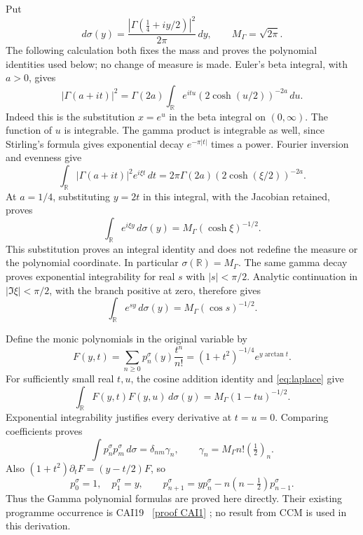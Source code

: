 \documentclass[11pt]{article}
\newcommand{\R}{\mathbb R}
\begin{document}
Put
\begin{equation}\label{eq:sigma}
 d\sigma(y)=\frac{|\Gamma(\tfrac14+iy/2)|^2}{2\pi}\,dy,
 \qquad M_\Gamma=\sqrt{2\pi}.
\end{equation}
The following calculation both fixes the mass and proves the polynomial
identities used below; no change of measure is made.
Euler's beta integral, with $a>0$, gives
\[
 |\Gamma(a+it)|^2
 =\Gamma(2a)\int_{\R}e^{itu}(2\cosh(u/2))^{-2a}\,du.
\]
Indeed this is the substitution $x=e^u$ in the beta integral on
$(0,\infty)$.  The function of $u$ is integrable.  The gamma product is
integrable as well, since Stirling's formula gives exponential decay
$e^{-\pi|t|}$ times a power.  Fourier inversion and evenness give
\[
 \int_{\R}|\Gamma(a+it)|^2e^{i\xi t}\,dt
 =2\pi\Gamma(2a)(2\cosh(\xi/2))^{-2a}.
\]
At $a=1/4$, substituting $y=2t$ in this integral, with the Jacobian
retained, proves
\begin{equation}\label{eq:transform}
 \int_{\R}e^{i\xi y}\,d\sigma(y)
 =M_\Gamma(\cosh\xi)^{-1/2}.
\end{equation}
This substitution proves an integral identity and does not redefine the
measure or the polynomial coordinate.  In particular
$\sigma(\R)=M_\Gamma$.  The same gamma decay proves exponential
integrability for real $s$ with $|s|<\pi/2$.  Analytic continuation in
$|\Im\xi|<\pi/2$, with the branch positive at zero, therefore gives
\begin{equation}\label{eq:laplace}
 \int_{\R}e^{sy}\,d\sigma(y)=M_\Gamma(\cos s)^{-1/2}.
\end{equation}

Define the monic polynomials in the original variable by
\begin{equation}\label{eq:gen}
 F(y,t)=\sum_{n\ge0}p_n^\sigma(y)\frac{t^n}{n!}
 =(1+t^2)^{-1/4}e^{y\arctan t}.
\end{equation}
For sufficiently small real $t,u$, the cosine addition identity and
\eqref{eq:laplace} give
\[
 \int_{\R}F(y,t)F(y,u)\,d\sigma(y)=M_\Gamma(1-tu)^{-1/2}.
\]
Exponential integrability justifies every derivative at $t=u=0$.
Comparing coefficients proves
\begin{equation}\label{eq:norms}
 \int p_n^\sigma p_m^\sigma\,d\sigma
 =\delta_{nm}\gamma_n,
 \qquad \gamma_n=M_\Gamma n!(\tfrac12)_n.
\end{equation}
Also $(1+t^2)\partial_tF=(y-t/2)F$, so
\begin{equation}\label{eq:monicrec}
 p_0^\sigma=1,\quad p_1^\sigma=y,\qquad
 p_{n+1}^\sigma=yp_n^\sigma-n(n-\tfrac12)p_{n-1}^\sigma.
\end{equation}
Thus the Gamma polynomial formulas are proved here directly.  Their
existing programme occurrence is CAI19 \cite{CAI}%
~\href{https://github.com/KokunoYumeto/zeta-function-research-reader/blob/487253b5b01851da5b9b98af4e146fecf1fab902/workbenches/splitzero-tandem/continuations/20260919-full-window-source-products/providers/CAI_COMPLETE_PREREQUISITE.tex\#L46}{[proof CAI1]}%
{}; no result from CCM
is used in this derivation.
\end{document}
